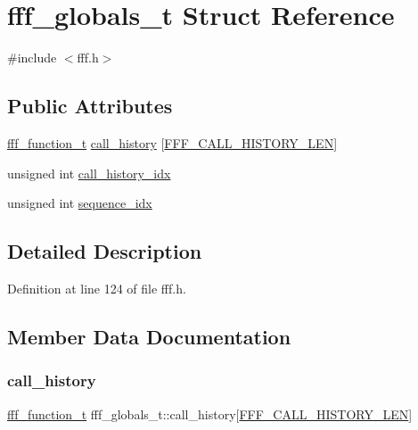 \hypertarget{structfff__globals__t}{}\section{fff\+\_\+globals\+\_\+t Struct Reference}
\label{structfff__globals__t}


{\ttfamily \#include $<$fff.\+h$>$}

\subsection*{Public Attributes}
\begin{DoxyCompactItemize}
\item 
\hyperlink{fff_8h_a5a81a0e0882be6192f4f18c7b8d41aa1}{fff\+\_\+function\+\_\+t} \hyperlink{structfff__globals__t_a94081826ed0bed160e35607052964374}{call\+\_\+history} \mbox{[}\hyperlink{fff_8h_a8056b9838c2f7a0defc054404737777b}{F\+F\+F\+\_\+\+C\+A\+L\+L\+\_\+\+H\+I\+S\+T\+O\+R\+Y\+\_\+\+L\+EN}\mbox{]}
\item 
unsigned int \hyperlink{structfff__globals__t_ad5c29f2faa27bef5e706417cd2a73eb5}{call\+\_\+history\+\_\+idx}
\item 
unsigned int \hyperlink{structfff__globals__t_a01b8f5a605a1eccdbab61e5d40cd4c57}{sequence\+\_\+idx}
\end{DoxyCompactItemize}


\subsection{Detailed Description}


Definition at line 124 of file fff.\+h.



\subsection{Member Data Documentation}
\mbox{\label{structfff__globals__t_a94081826ed0bed160e35607052964374}} 
\subsubsection{\texorpdfstring{call\+\_\+history}{call\_history}}
{\footnotesize\ttfamily \hyperlink{fff_8h_a5a81a0e0882be6192f4f18c7b8d41aa1}{fff\+\_\+function\+\_\+t} fff\+\_\+globals\+\_\+t\+::call\+\_\+history\mbox{[}\hyperlink{fff_8h_a8056b9838c2f7a0defc054404737777b}{F\+F\+F\+\_\+\+C\+A\+L\+L\+\_\+\+H\+I\+S\+T\+O\+R\+Y\+\_\+\+L\+EN}\mbox{]}}



